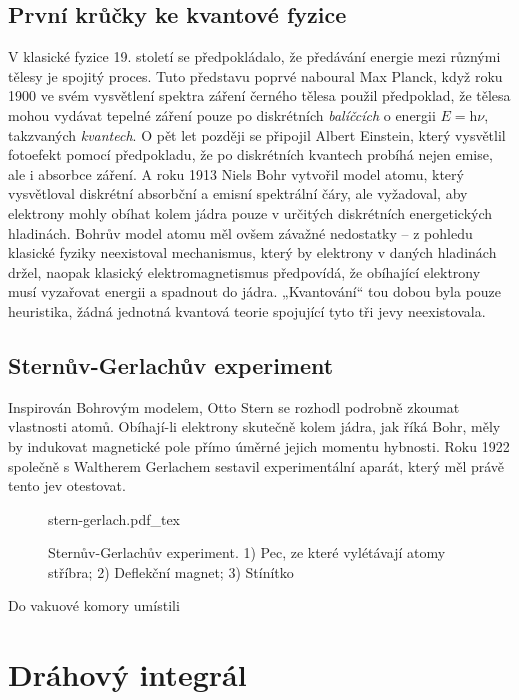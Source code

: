 \documentclass[10pt,a4paper]{report}
\newcommand{\incfig}[2][\columnwidth]{%
    \def\svgwidth{#1}
    {#2.pdf_tex}
}
\newcommand{\h}{\mathrm{h}}
\theoremstyle{definition}
\begin{document}
\section{První krůčky ke kvantové fyzice}
V klasické fyzice 19. století se předpokládalo, že předávání energie mezi různými tělesy je spojitý proces. Tuto představu poprvé naboural Max Planck, když roku 1900 ve svém vysvětlení spektra záření černého tělesa použil předpoklad, že tělesa mohou vydávat tepelné záření pouze po diskrétních \textit{balíčcích} o energii $E = \h\nu$, takzvaných \textit{kvantech}. O pět let později se připojil Albert Einstein, který vysvětlil fotoefekt pomocí předpokladu, že po diskrétních kvantech probíhá nejen emise, ale i absorbce záření. A roku 1913 Niels Bohr vytvořil model atomu, který vysvětloval diskrétní absorbční a emisní spektrální čáry, ale vyžadoval, aby elektrony mohly obíhat kolem jádra pouze v určitých diskrétních energetických hladinách. Bohrův model atomu měl ovšem závažné nedostatky – z pohledu klasické fyziky neexistoval mechanismus, který by elektrony v daných hladinách držel, naopak klasický elektromagnetismus předpovídá, že obíhající elektrony musí vyzařovat energii a spadnout do jádra. „Kvantování“ tou dobou byla pouze heuristika, žádná jednotná kvantová teorie spojující tyto tři jevy neexistovala.

\section{Sternův-Gerlachův experiment}
Inspirován Bohrovým modelem, Otto Stern se rozhodl podrobně zkoumat vlastnosti atomů. Obíhají-li elektrony skutečně kolem jádra, jak říká Bohr, měly by indukovat magnetické pole přímo úměrné jejich momentu hybnosti. Roku 1922 společně s Waltherem Gerlachem sestavil experimentální aparát, který měl právě tento jev otestovat.

\begin{figure}[ht]
    \centering
    \incfig[8cm]{stern-gerlach}
    \caption{Sternův-Gerlachův experiment. 1) Pec, ze které vylétávají atomy stříbra; 2) Deflekční magnet; 3) Stínítko}
    \label{fig:stern-gerlach-vanilla}
\end{figure}

Do vakuové komory umístili 


\pagebreak

\chapter{Dráhový integrál}\label{chapter-feynman}
\end{document}
